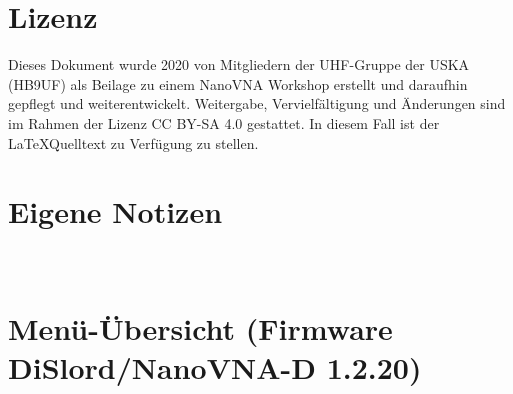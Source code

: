 \documentclass[twoside,a4paper,11pt,halfparskip,DIV=11,notitlepage]{scrartcl}
\begin{document}
\newpage
\section*{Lizenz}
Dieses Dokument wurde 2020 von Mitgliedern der UHF-Gruppe der USKA (HB9UF) als Beilage zu
einem NanoVNA Workshop erstellt und daraufhin gepflegt und weiterentwickelt.
Weitergabe, Vervielfältigung und Änderungen sind im Rahmen der Lizenz CC BY-SA
4.0 gestattet. In diesem Fall ist der \LaTeX Quelltext zu Verfügung zu stellen.





\newpage
\section*{Eigene Notizen}
\pagestyle{empty}
~\newpage

\section*{Menü-Übersicht (Firmware DiSlord/NanoVNA-D 1.2.20)}\label{sec:menu}
\end{document}
